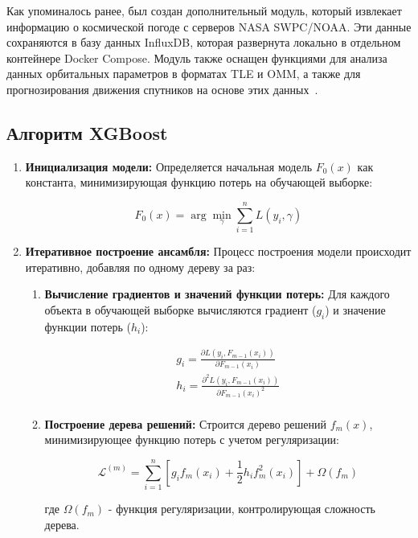 \documentclass[14pt, a4paper]{extreport}
\begin{document}
    Как упоминалось ранее, был создан дополнительный модуль, который извлекает информацию о космической погоде с серверов NASA SWPC/NOAA. Эти данные сохраняются в базу данных InfluxDB, которая развернута локально в отдельном контейнере Docker Compose.
    Модуль также оснащен функциями для анализа данных орбитальных параметров в форматах TLE и OMM, а также для прогнозирования движения спутников на основе этих данных~\cite{bottou_1991_stochastic,killick_2012_optimal}.

    \subsection{Алгоритм XGBoost}

    \begin{enumerate}[label=\arabic*.]
        \item \textbf{Инициализация модели:}
        Определяется начальная модель $F_0(x)$ как константа, минимизирующая функцию потерь на обучающей выборке:

        \[F_0(x) = \arg \min_{\gamma} \sum_{i=1}^n L(y_i, \gamma)\]

        \item \textbf{Итеративное построение ансамбля:}
        Процесс построения модели происходит итеративно, добавляя по одному дереву за раз:
        \begin{enumerate}[label=\roman*.]
            \item \textbf{Вычисление градиентов и значений функции потерь:} Для каждого объекта в обучающей выборке вычисляются градиент ($g_i$) и значение функции потерь ($h_i$):

            \begin{gather*}
                g_i = \frac{\partial L(y_i, F_{m-1}(x_i))}{\partial F_{m-1}(x_i)}\\
                h_i = \frac{\partial^2 L(y_i, F_{m-1}(x_i))}{\partial F_{m-1}(x_i)^2}\\
            \end{gather*}

            \item \textbf{Построение дерева решений:} Строится дерево решений $f_m(x)$, минимизирующее функцию потерь с учетом регуляризации:

            \[\mathcal{L}^{(m)} = \sum_{i=1}^n \left[ g_i f_m(x_i) + \frac{1}{2} h_i f_m^2(x_i) \right] + \Omega(f_m)\]

            где $\Omega(f_m)$ - функция регуляризации, контролирующая сложность дерева.


\end{enumerate}
\end{enumerate}
\end{document}
